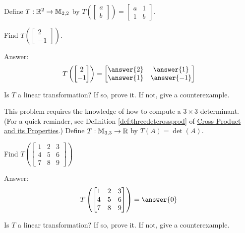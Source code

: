 \documentclass{ximera}
\begin{document}
\begin{problem}
Define $T:\mathbb{R}^2\rightarrow\mathbb{M}_{2,2}$ by $T\left(\begin{bmatrix}a\\b\end{bmatrix}\right)=\begin{bmatrix}a&1\\1&b\end{bmatrix}$.

\begin{problem}\label{prob:lintransr2toM22part1}
Find $T\left(\begin{bmatrix}2\\-1\end{bmatrix}\right)$.

Answer: $$T\left(\begin{bmatrix}2\\-1\end{bmatrix}\right)=\begin{bmatrix}\answer{2}&\answer{1}\\\answer{1}&\answer{-1}\end{bmatrix}$$
\end{problem}
\begin{problem}\label{prob:lintransr2toM22part2}
Is $T$ a linear transformation?  If so, prove it.  If not, give a counterexample.
\end{problem}
\end{problem}

\begin{problem}  This problem requires the knowledge of how to compute a $3\times 3$ determinant. (For a quick reminder, see Definition \ref{def:threedetcrossprod} of \href{https://ximera.osu.edu/oerlinalg/LinearAlgebra/VEC-0080/main}{Cross Product and its Properties}.)
Define $T:\mathbb{M}_{3,3}\rightarrow \mathbb{R}$ by $T(A)=\det(A)$.  

\begin{problem}\label{prob:detlintrans1}
Find $T\left(\begin{bmatrix}1&2&3\\4&5&6\\7&8&9\end{bmatrix}\right)$

Answer: $$T\left(\begin{bmatrix}1&2&3\\4&5&6\\7&8&9\end{bmatrix}\right)=\answer{0}$$
\end{problem}

\begin{problem}\label{prob:detlintrans2}
Is $T$ a linear transformation?  If so, prove it.  If not, give a counterexample.
\end{problem}
\end{problem}
\end{document}
